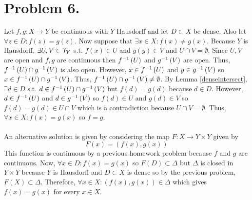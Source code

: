 \documentclass[12pt]{extarticle}
\begin{document}
\section*{Problem 6.} Let $f,g : X \rightarrow Y$ be continuous with $Y$ Hausdorff and let $D \subset X$ be dense. Also let $\forall z \in D : f(z) = g(z)$. Now suppose that $\exists x \in X : f(x) \neq g(x)$. Because $Y$ is Hausdorff, $\exists U, V \in \mathcal{T}_Y$ s.t. $f(x) \in U$ and $g(y) \in V$ and $U \cap V = \emptyset$. Since $U, V$ are open and $f,g$ are continuous then $f^{-1} \left( U \right)$ and $g^{-1} \left( V \right)$ are open. Thus, $f^{-1} \left( U \right) \cap g^{-1} \left( V \right)$ is also open. However, $x \in f^{-1} \left( U \right)$ and $y \in g^{-1} \left( V \right)$ so $x \in f^{-1} \left( U \right) \cap g^{-1} \left( V \right)$. Thus, $f^{-1} \left( U \right) \cap g^{-1} \left( V \right) \neq \emptyset$. By Lemma \ref{denseintersect}, $\exists d \in D$ s.t. $d \in f^{-1} \left( U \right) \cap g^{-1} \left( V \right)$ but $f(d) = g(d)$ because $d \in D$. However, $d \in f^{-1} \left( U \right)$ and $d \in g^{-1} \left( V \right)$ so $f(d) \in U$ and $g(d) \in V$ so $f(d) = g(d) \in U \cap V$ which is a contradiction because $U \cap V = \emptyset$. Thus, $\forall x \in X : f(x) = g(x)$ so $f = g$. \\ \\
An alternative solution is given by considering the map $F : X \rightarrow Y \times Y$ given by \[F(x) = (f(x), g(x))\] This function is continuous by a previous homework problem because $f$ and $g$ are continuous. Now, $\forall x \in D : f(x) = g(x)$ so $F(D) \subset \Delta$ but $\Delta$ is closed in $Y \times Y$ because $Y$ is Hausdorff and $D \subset X$ is dense so by the previous problem, $F(X) \subset \Delta$. Therefore, $\forall x \in X : (f(x), g(x)) \in \Delta$ which gives $f(x) = g(x)$ for every $x \in X$.
\end{document}
